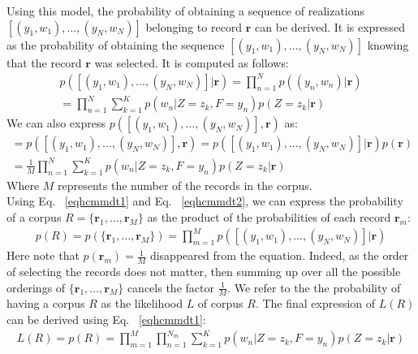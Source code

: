 Using this model, the probability of obtaining a sequence of realizations $[(y_{1},w_{1}),...,(y_{N},w_{N})]$ belonging to record $\mathbf{r}$ can be derived. It is expressed as the probability of obtaining the sequence $[(y_{1},w_{1}),...,(y_{N},w_{N})]$ knowing that the record $\mathbf{r}$ was selected. It is computed as follows:
\begin{equation} \label{eqhcmmdt1}
\begin{split}
p([(y_{1},w_{1}),...,(y_{N},w_{N})]|\mathbf{r})=\prod_{n=1}^{N}p((y_{n},w_{n})|\mathbf{r})
\\=\prod_{n=1}^{N}\sum_{k=1}^{K}p(w_{n}|Z=z_{k}, F=y_{n})p(Z=z_{k}|\mathbf{r})
\end{split}
\end{equation}
We can also express $p([(y_{1},w_{1}),...,(y_{N},w_{N})] , \mathbf{r})$ as:
\begin{equation} \label{eqhcmmdt2}
\begin{split}
=p([(y_{1},w_{1}),...,(y_{N},w_{N})] , \mathbf{r})=p([(y_{1},w_{1}),...,(y_{N},w_{N})]|\mathbf{r})p(\mathbf{r})
\\=\frac{1}{M}\prod_{n=1}^{N}\sum_{k=1}^{K}p(w_{n}|Z=z_{k}, F=y_{n})p(Z=z_{k}|\mathbf{r})
\end{split}
\end{equation}
Where $M$ represents the number of the records in the corpus.
\\Using Eq. ~\eqref{eqhcmmdt1} and Eq. ~\eqref{eqhcmmdt2}, we can express the probability of a corpus $R=\{\mathbf{r}_{1},...,\mathbf{r}_{M}\}$ as the product of the probabilities of each record $\mathbf{r}_{m}$:
\begin{equation} \label{eqhcmmdt3}
\begin{split}
p(R)=p(\{\mathbf{r}_{1},...,\mathbf{r}_{M}\})=\prod_{m=1}^{M}p([(y_{1},w_{1}),...,(y_{N},w_{N})]|\mathbf{r})
\end{split}
\end{equation}
Here note that $p(\mathbf{r}_{m})=\frac{1}{M}$ disappeared from the equation. Indeed, as the order of selecting the records does not matter, then summing up over all the possible orderings of $\{\mathbf{r}_{1},...,\mathbf{r}_{M}\}$ cancels the factor $\frac{1}{M}$. We refer to the the probability of having a corpus $R$ as the likelihood $L$ of corpus $R$. The final expression of $L(R)$ can be derived using Eq. ~\eqref{eqhcmmdt1}:
\begin{equation} \label{eqhcmmdt4}
\begin{split}
L(R)=p(R)=\prod_{m=1}^{M}\prod_{n=1}^{N_{m}}\sum_{k=1}^{K}p(w_{n}|Z=z_{k}, F=y_{n})p(Z=z_{k}|\mathbf{r})
\end{split}
\end{equation} \par


